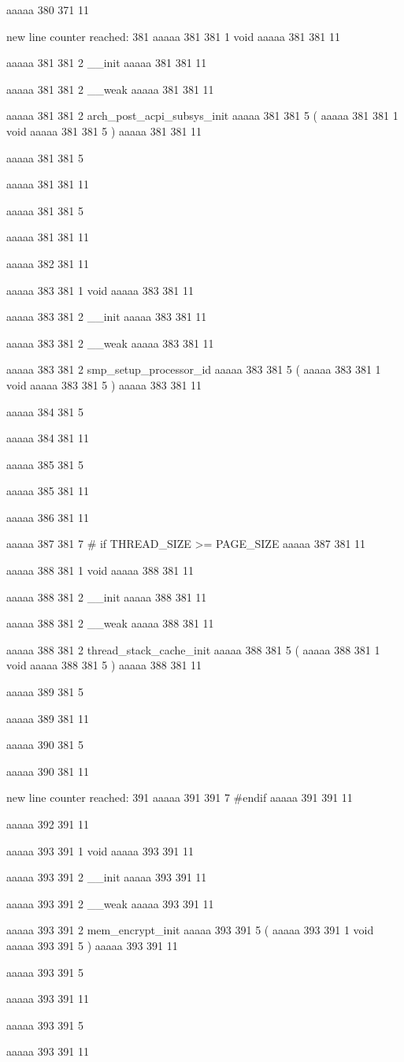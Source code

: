 aaaaa 380 371
11


new line counter reached: 381
aaaaa 381 381
1
void
aaaaa 381 381
11
 
aaaaa 381 381
2
__init
aaaaa 381 381
11
 
aaaaa 381 381
2
__weak
aaaaa 381 381
11
 
aaaaa 381 381
2
arch_post_acpi_subsys_init
aaaaa 381 381
5
(
aaaaa 381 381
1
void
aaaaa 381 381
5
)
aaaaa 381 381
11
 
aaaaa 381 381
5
{
aaaaa 381 381
11
 
aaaaa 381 381
5
}
aaaaa 381 381
11


aaaaa 382 381
11


aaaaa 383 381
1
void
aaaaa 383 381
11
 
aaaaa 383 381
2
__init
aaaaa 383 381
11
 
aaaaa 383 381
2
__weak
aaaaa 383 381
11
 
aaaaa 383 381
2
smp_setup_processor_id
aaaaa 383 381
5
(
aaaaa 383 381
1
void
aaaaa 383 381
5
)
aaaaa 383 381
11


aaaaa 384 381
5
{
aaaaa 384 381
11


aaaaa 385 381
5
}
aaaaa 385 381
11


aaaaa 386 381
11


aaaaa 387 381
7
# if THREAD_SIZE >= PAGE_SIZE
aaaaa 387 381
11


aaaaa 388 381
1
void
aaaaa 388 381
11
 
aaaaa 388 381
2
__init
aaaaa 388 381
11
 
aaaaa 388 381
2
__weak
aaaaa 388 381
11
 
aaaaa 388 381
2
thread_stack_cache_init
aaaaa 388 381
5
(
aaaaa 388 381
1
void
aaaaa 388 381
5
)
aaaaa 388 381
11


aaaaa 389 381
5
{
aaaaa 389 381
11


aaaaa 390 381
5
}
aaaaa 390 381
11


new line counter reached: 391
aaaaa 391 391
7
#endif
aaaaa 391 391
11


aaaaa 392 391
11


aaaaa 393 391
1
void
aaaaa 393 391
11
 
aaaaa 393 391
2
__init
aaaaa 393 391
11
 
aaaaa 393 391
2
__weak
aaaaa 393 391
11
 
aaaaa 393 391
2
mem_encrypt_init
aaaaa 393 391
5
(
aaaaa 393 391
1
void
aaaaa 393 391
5
)
aaaaa 393 391
11
 
aaaaa 393 391
5
{
aaaaa 393 391
11
 
aaaaa 393 391
5
}
aaaaa 393 391
11


